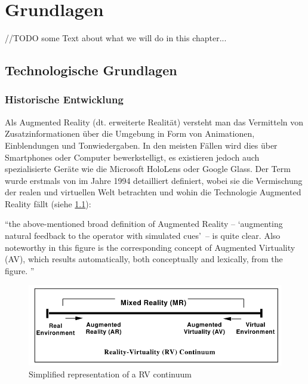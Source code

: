 \documentclass[a4paper]{scrreprt}
\begin{document}
\chapter{Grundlagen}
\label{ch:StandDerForschung}

//TODO some Text about what we will do in this chapter...

\section{Technologische Grundlagen}

\subsection{Historische Entwicklung}
Als Augmented Reality (dt. erweiterte Realität) versteht man das Vermitteln von Zusatzinformationen über die Umgebung in Form von Animationen, Einblendungen und Tonwiedergaben. In den meisten Fällen wird dies über Smartphones oder Computer bewerkstelligt, es existieren jedoch auch spezialisierte Geräte wie die Microsoft HoloLens oder Google Glass. Der Term wurde erstmals von \citeauthor{Milgram1994} im Jahre 1994 detailliert definiert, wobei sie die Vermischung der realen und virtuellen Welt betrachten und wohin die Technologie Augmented Reality fällt (siehe \ref{fig:RVContiinum}):

\vspace{1em}

\textquotedblleft the above-mentioned broad definition of Augmented Reality –  \textquoteleft augmenting natural feedback to the operator with simulated cues\textquoteright\ – is quite clear. Also noteworthy in this figure is the corresponding concept of Augmented Virtuality (AV), which results automatically, both conceptually and lexically, from the figure. \textquotedblright\ \parencite{Milgram1994}

\begin{figure}[htb]
	\includegraphics[keepaspectratio, width=\textwidth]{MR_milgram.png}
	\caption{Simplified representation of a RV continuum \parencite{Milgram1994}}
	\label{fig:RVContiinum}
\end{figure}
\end{document}
